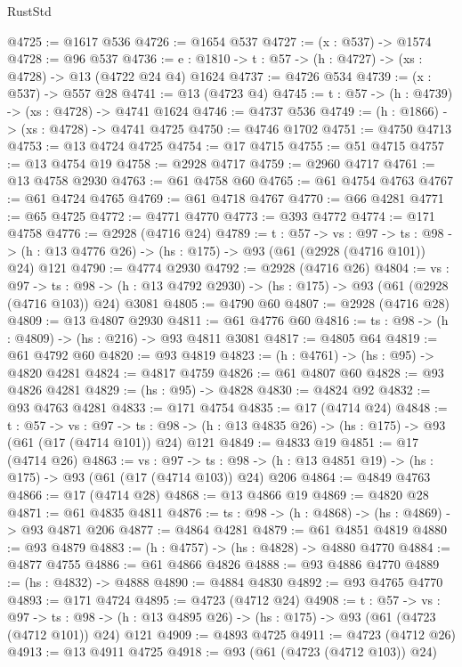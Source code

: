 \begin{lexlean}{RustStd}
\begin{coremodule}
@4725 := @1617 @536
@4726 := @1654 @537
@4727 := (x : @537) -> @1574
@4728 := @96 @537
@4736 := {e : @1810} -> {t : @57} -> (h : @4727) -> (xs : @4728) -> @13 (@4722 @24 @4) @1624
@4737 := @4726 @534
@4739 := (x : @537) -> @557 @28
@4741 := @13 (@4723 @4)
@4745 := {t : @57} -> (h : @4739) -> (xs : @4728) -> @4741 @1624
@4746 := @4737 @536
@4749 := (h : @1866) -> (xs : @4728) -> @4741 @4725
@4750 := @4746 @1702
@4751 := @4750 @4713
@4753 := @13 @4724 @4725
@4754 := @17 @4715
@4755 := @51 @4715
@4757 := @13 @4754 @19
@4758 := @2928 @4717
@4759 := @2960 @4717
@4761 := @13 @4758 @2930
@4763 := @61 @4758 @60
@4765 := @61 @4754 @4763
@4767 := @61 @4724 @4765
@4769 := @61 @4718 @4767
@4770 := @66 @4281
@4771 := @65 @4725
@4772 := @4771 @4770
@4773 := @393 @4772
@4774 := @171 @4758
@4776 := @2928 (@4716 @24)
@4789 := {t : @57} ->
  {vs : @97} ->
  {ts : @98} -> (h : @13 @4776 @26) -> (hs : @175) -> @93 (@61 (@2928 (@4716 @101)) @24) @121
@4790 := @4774 @2930
@4792 := @2928 (@4716 @26)
@4804 := {vs : @97} ->
  {ts : @98} -> (h : @13 @4792 @2930) -> (hs : @175) -> @93 (@61 (@2928 (@4716 @103)) @24) @3081
@4805 := @4790 @60
@4807 := @2928 (@4716 @28)
@4809 := @13 @4807 @2930
@4811 := @61 @4776 @60
@4816 := {ts : @98} -> (h : @4809) -> (hs : @216) -> @93 @4811 @3081
@4817 := @4805 @64
@4819 := @61 @4792 @60
@4820 := @93 @4819
@4823 := (h : @4761) -> (hs : @95) -> @4820 @4281
@4824 := @4817 @4759
@4826 := @61 @4807 @60
@4828 := @93 @4826 @4281
@4829 := (hs : @95) -> @4828
@4830 := @4824 @92
@4832 := @93 @4763 @4281
@4833 := @171 @4754
@4835 := @17 (@4714 @24)
@4848 := {t : @57} ->
  {vs : @97} ->
  {ts : @98} -> (h : @13 @4835 @26) -> (hs : @175) -> @93 (@61 (@17 (@4714 @101)) @24) @121
@4849 := @4833 @19
@4851 := @17 (@4714 @26)
@4863 := {vs : @97} ->
  {ts : @98} -> (h : @13 @4851 @19) -> (hs : @175) -> @93 (@61 (@17 (@4714 @103)) @24) @206
@4864 := @4849 @4763
@4866 := @17 (@4714 @28)
@4868 := @13 @4866 @19
@4869 := @4820 @28
@4871 := @61 @4835 @4811
@4876 := {ts : @98} -> (h : @4868) -> (hs : @4869) -> @93 @4871 @206
@4877 := @4864 @4281
@4879 := @61 @4851 @4819
@4880 := @93 @4879
@4883 := (h : @4757) -> (hs : @4828) -> @4880 @4770
@4884 := @4877 @4755
@4886 := @61 @4866 @4826
@4888 := @93 @4886 @4770
@4889 := (hs : @4832) -> @4888
@4890 := @4884 @4830
@4892 := @93 @4765 @4770
@4893 := @171 @4724
@4895 := @4723 (@4712 @24)
@4908 := {t : @57} ->
  {vs : @97} ->
  {ts : @98} -> (h : @13 @4895 @26) -> (hs : @175) -> @93 (@61 (@4723 (@4712 @101)) @24) @121
@4909 := @4893 @4725
@4911 := @4723 (@4712 @26)
@4913 := @13 @4911 @4725
@4918 := @93 (@61 (@4723 (@4712 @103)) @24)

\end{coremodule}
\end{lexlean}
